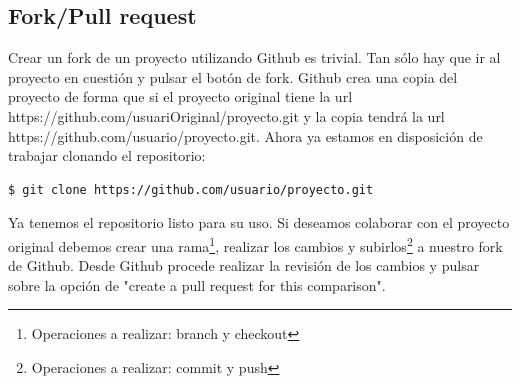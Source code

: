 \subsection{Fork/Pull request}

Crear un fork de un proyecto utilizando Github es trivial. Tan sólo hay que ir al proyecto en cuestión y pulsar el botón de fork. Github crea una copia del proyecto de forma que si el proyecto original tiene la url https://github.com/usuariOriginal/proyecto.git y la copia tendrá la url https://github.com/usuario/proyecto.git. Ahora ya estamos en disposición de trabajar clonando el repositorio:

\begin{lstlisting}[language=bash, numbers=none]
$ git clone https://github.com/usuario/proyecto.git
\end{lstlisting}

Ya tenemos el repositorio listo para su uso. Si deseamos colaborar con el proyecto original debemos crear una rama\footnote{Operaciones a realizar: branch y checkout}, realizar los cambios y subirlos\footnote{Operaciones a realizar: commit y push} a nuestro fork de Github.  Desde Github procede realizar la revisión de los cambios y pulsar sobre la opción de "create a pull request for this comparison".
